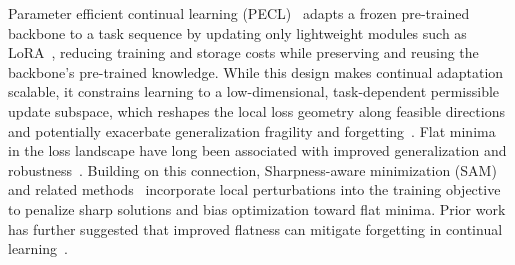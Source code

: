 \documentclass{article}
\theoremstyle{plain}
\theoremstyle{definition}
\theoremstyle{remark}
\begin{document}

Parameter efficient continual learning (PECL)~\cite{Gao_2023_ICCV,qiaoLearnMoreBother2024} adapts a frozen pre-trained backbone to a task sequence by updating only lightweight modules such as LoRA~\cite{hu2022lora}, reducing training and storage costs while preserving and reusing the backbone’s pre-trained knowledge. While this design makes continual adaptation scalable, it constrains learning to a low-dimensional, task-dependent permissible update subspace, which reshapes the local loss geometry along feasible directions and potentially exacerbate generalization fragility and forgetting~\citep{NEURIPS2024_4eb2c0ad,li2024flatlora}.
Flat minima in the loss landscape have long been associated with improved generalization and robustness~\citep{FlatMinima1997,wu2017understandinggeneralizationdeeplearning}.
Building on this connection,
Sharpness-aware minimization (SAM)~\cite{foretSharpnessAwareMinimizationEfficiently2021} and related methods~\citep{pmlr-v151-bisla22a,Zhang_GAM,NEURIPS2024_C-Flat} incorporate local perturbations into the training objective to penalize sharp solutions and bias optimization toward flat minima.
Prior work has further suggested that improved flatness can mitigate forgetting in continual learning~\cite{NEURIPS2020_518a38cc,JMLRAnEmpiricalInvestigatio,shiOvercomingCatastrophicForgetting2021,liRevisitingCatastrophicForgetting2024}.
\end{document}
